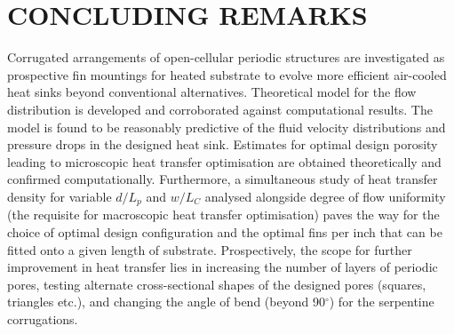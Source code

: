 \documentclass[twocolumn,10pt,cleanfoot]{ihmtc}
\begin{document}
\section{CONCLUDING REMARKS}
Corrugated arrangements of open-cellular periodic structures are investigated as prospective fin mountings for heated substrate to evolve more efficient air-cooled heat sinks beyond conventional alternatives. Theoretical model for the flow distribution is developed and corroborated against computational results. The model is found to be reasonably predictive of the fluid velocity distributions and pressure drops in the designed heat sink. Estimates for optimal design porosity leading to microscopic heat transfer optimisation are obtained theoretically and confirmed computationally. Furthermore, a simultaneous study of heat transfer density for variable $d/L_p$ and $w/L_C$ analysed alongside degree of flow uniformity (the requisite for macroscopic heat transfer optimisation) paves the way for the choice of optimal design configuration and the optimal fins per inch that can be fitted onto a given length of substrate. Prospectively, the scope for further improvement in heat transfer lies in increasing the number of layers of periodic pores, testing alternate cross-sectional shapes of the designed pores (squares, triangles etc.), and changing the angle of bend (beyond 90$^\circ$) for the serpentine corrugations.



\end{document}
